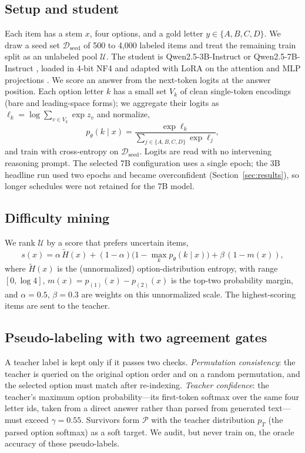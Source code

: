 \documentclass[conference]{IEEEtran}
\begin{document}
\subsection{Setup and student}
Each item has a stem $x$, four options, and a gold letter $y\in\{A,B,C,D\}$. We draw a seed set $\mathcal{D}_{\text{seed}}$ of 500 to 4{,}000 labeled items and treat the remaining train split as an unlabeled pool $\mathcal{U}$. The student is Qwen2.5-3B-Instruct or Qwen2.5-7B-Instruct \cite{qwen}, loaded in 4-bit NF4 and adapted with LoRA on the attention and MLP projections \cite{lora,qlora}. We score an answer from the next-token logits at the answer position. Each option letter $k$ has a small set $V_k$ of clean single-token encodings (bare and leading-space forms); we aggregate their logits as $\ell_k=\log\sum_{v\in V_k}\exp z_v$ and normalize,
\begin{equation}
p_\theta(k\mid x)=\frac{\exp \ell_k}{\sum_{j\in\{A,B,C,D\}}\exp \ell_j},
\end{equation}
and train with cross-entropy on $\mathcal{D}_{\text{seed}}$. Logits are read with no intervening reasoning prompt. The selected 7B configuration uses a single epoch; the 3B headline run used two epochs and became overconfident (Section~\ref{sec:results}), so longer schedules were not retained for the 7B model.

\subsection{Difficulty mining}
We rank $\mathcal{U}$ by a score that prefers uncertain items,
\begin{equation}
s(x)=\alpha\,\tilde{H}(x)+(1-\alpha)\bigl(1-\textstyle\max_k p_\theta(k\mid x)\bigr)+\beta\,(1-m(x)),
\end{equation}
where $\tilde{H}(x)$ is the (unnormalized) option-distribution entropy, with range $[0,\log 4]$, $m(x)=p_{(1)}(x)-p_{(2)}(x)$ is the top-two probability margin, and $\alpha=0.5$, $\beta=0.3$ are weights on this unnormalized scale. The highest-scoring items are sent to the teacher.

\subsection{Pseudo-labeling with two agreement gates}
A teacher label is kept only if it passes two checks. \emph{Permutation consistency}: the teacher is queried on the original option order and on a random permutation, and the selected option must match after re-indexing. \emph{Teacher confidence}: the teacher's maximum option probability---its first-token softmax over the same four letter ids, taken from a direct answer rather than parsed from generated text---must exceed $\gamma=0.55$. Survivors form $\mathcal{P}$ with the teacher distribution $p_T$ (the parsed option softmax) as a soft target. We audit, but never train on, the oracle accuracy of these pseudo-labels.
\end{document}

